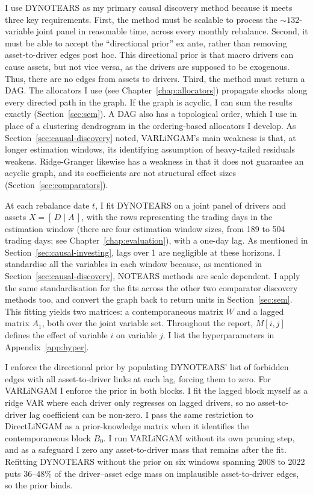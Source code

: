 \documentclass[11pt, a4paper]{report}
\begin{document}
I use DYNOTEARS as my primary causal discovery method because it meets three key requirements.
First, the method must be scalable to process the ${\sim}132$-variable joint panel in reasonable time, across every monthly rebalance.
Second, it must be able to accept the ``directional prior'' ex ante, rather than removing asset-to-driver edges post hoc. This directional prior is that macro drivers can cause assets, but not vice versa, as the drivers are supposed to be exogenous. Thus, there are no edges from assets to drivers.
Third, the method must return a DAG. The allocators I use (see Chapter~\ref{chap:allocators}) propagate shocks along every directed path in the graph. If the graph is acyclic, I can sum the results exactly (Section~\ref{sec:sem}). 
A DAG also has a topological order, which I use in place of a clustering dendrogram in the ordering-based allocators I develop.
As Section~\ref{sec:causal-discovery} noted, VARLiNGAM's main weakness is that, at longer estimation windows, its identifying assumption of heavy-tailed residuals weakens. Ridge-Granger likewise has a weakness in that it does not guarantee an acyclic graph, and its coefficients are not structural effect sizes (Section~\ref{sec:comparators}).

At each rebalance date $t$, I fit DYNOTEARS on
a joint panel of drivers and assets $X=[\,D \mid A\,]$, with the rows representing the trading days in the estimation window
(there are four estimation window sizes, from 189 to 504 trading days; see Chapter~\ref{chap:evaluation}), with a one-day lag.
As mentioned in Section~\ref{sec:causal-investing}, lags over 1 are negligible at these horizons.
I standardise all the variables in each window because, as mentioned in Section~\ref{sec:causal-discovery}, NOTEARS methods are scale dependent. I apply the same standardisation for the fits across the other two comparator discovery methods too, and convert the graph back to return units in Section~\ref{sec:sem}.
This fitting yields two matrices: a contemporaneous matrix $W$ and a lagged matrix $A_1$, both over the joint variable set.
Throughout the report, $M[i,j]$ defines the effect of variable $i$ on variable $j$.
I list the hyperparameters in Appendix~\ref{app:hyper}.

I enforce the directional prior by populating DYNOTEARS' list of forbidden edges with all asset-to-driver links at each lag, forcing them to zero.
For VARLiNGAM I enforce the prior in both blocks. I fit the lagged block myself as a ridge VAR where each driver only regresses on lagged drivers, so no asset-to-driver lag coefficient can be non-zero. I pass the same restriction to DirectLiNGAM as a prior-knowledge matrix when it identifies the contemporaneous block $B_0$. I run VARLiNGAM without its own pruning step, and as a safeguard I zero any asset-to-driver mass that remains after the fit.
Refitting DYNOTEARS without the prior on six windows spanning 2008 to 2022 puts 36--48\% of the driver--asset edge mass on implausible asset-to-driver edges, so the prior binds.
\end{document}
